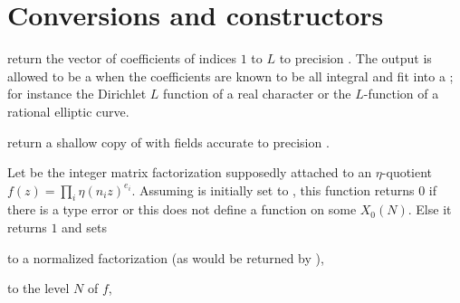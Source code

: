 








\section{Conversions and constructors}





return the vector of coefficients of indices $1$ to $L$ to precision
. The output is allowed to be a  when the
coefficients are known to be all integral and fit into a ;
for instance the Dirichlet $L$ function of a real character or the
$L$-function of a rational elliptic curve.

return a shallow copy of  with fields accurate to precision
.

 Let  be the integer matrix factorization supposedly
attached to an $\eta$-quotient $f(z) = \prod_i \eta(n_i z)^{e_i}$. Assuming
 is initially set to , this function returns $0$ if
there is a type error or this does not define a function on some $X_0(N)$.
Else it returns $1$ and sets

\item {} to a normalized factorization (as would be returned by
),

\item {} to the level $N$ of $f$,

